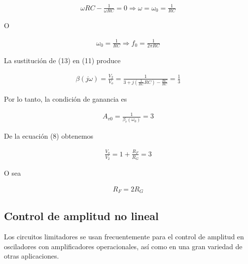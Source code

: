 \documentclass{article}
\begin{document}
\begin{align}
	\omega RC - \frac{1}{\omega RC} = 0 \Rightarrow \omega = \omega_0 = \frac{1}{RC} \nonumber
\end{align}

O

\begin{align}
 \omega_0 = \frac{1}{RC}  \Rightarrow	f_0 = \frac{1}{2 \pi RC}
\end{align}

La sustitución de (13) en (11) produce 

\begin{align}
	\beta (j \omega) = \frac{V_2}{V_o} = \frac{1}{3 + j(\frac{1}{ RC} RC) - \frac{RC}{RC}} = \frac{1}{3}
\end{align}

Por lo tanto, la condición de ganancia es

\begin{align}
	A_{v0} = \frac{1}{\beta_r(\omega_0)} = 3
\end{align}

De la ecuación (8) obtenemos

\begin{align}
	\frac{V_o}{V_2} = 1 + \frac{R_F}{R_G} = 3
\end{align}

O sea

\begin{align}
	R_F = 2R_G
\end{align}

\subsection*{Control de amplitud no lineal}
Los circuitos limitadores se usan frecuentemente para el control de amplitud en osciladores con amplificadores operacionales, así como en una gran variedad de otras aplicaciones.
\end{document}

